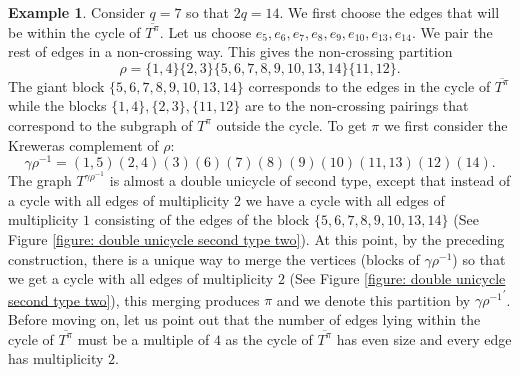 \documentclass{article}
\theoremstyle{definition}
\newtheorem{example}    [theorem]{Example}
\begin{document}
{\begin{example}\label{Example: double unicycle second type two}
Consider $q=7$ so that $2q=14$. We first choose the edges that will be within the cycle of $\overline{T^\pi}$. Let us choose $e_5,e_6,e_7,e_8,e_9,e_{10},e_{13},e_{14}$. We pair the rest of edges in a non-crossing way. This gives the non-crossing partition
$$\rho=\{1,4\}\{2,3\}\{5,6,7,8,9,10,13,14\}\{11,12\}.$$
The giant block $\{5,6,7,8,9,10,13,14\}$ corresponds to the edges in the cycle of $\overline{T^\pi}$ while the blocks $\{1,4\},\{2,3\},\{11,12\}$ are to the non-crossing pairings that correspond to the subgraph of $T^\pi$ outside the cycle. 
To get $\pi$ we first consider the Kreweras complement of $\rho$:
$$\gamma\rho^{-1}=(1,5)(2,4)(3)(6)(7)(8)(9)(10)(11,13)(12)(14).$$
The graph $T^{\gamma\rho^{-1}}$ is almost a double unicycle of second type, except that instead of a cycle with all edges of multiplicity $2$ we have a cycle with all edges of multiplicity $1$ consisting of the edges of the block $\{5,6,7,8,9,10,13,14\}$ (See Figure \ref{figure: double unicycle second type two}). At this point, by the preceding construction, there is a unique way to merge the vertices (blocks of $\gamma\rho^{-1}$) so that we get a cycle with all edges of multiplicity $2$ (See Figure \ref{figure: double unicycle second type two}), this merging produces $\pi$ and we denote this partition by ${\gamma\rho^{-1}}^\prime$.
Before moving on, let us point out that the number of edges lying within the cycle of $\overline{T^\pi}$ must be a multiple of $4$ as the cycle of $\overline{T^\pi}$ has even size and every edge has multiplicity $2$. 
\begin{figure}[p]
\centering
\sffamily\sansmath
{}


\begin{minipage}{0.44\linewidth}
\centering
\begin{tikzpicture}[font=\small]


\end{tikzpicture}
\end{minipage}
\end{figure}
\end{example}}
\end{document}
